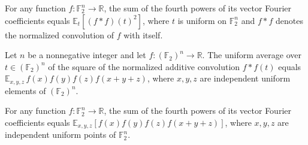 \begin{theorem}
\label{FABL.vectorFourierFourthMoment_eq_expect_convolution_mul_self}
\leanok
{}
For any function $f:\mathbb{F}_2^n\to\mathbb{R}$, the sum of the fourth powers of its
vector Fourier coefficients equals $\mathbb{E}_t[(f*f)(t)^2]$, where $t$ is uniform on
$\mathbb{F}_2^n$ and $f*f$ denotes the normalized convolution of $f$ with itself.
\end{theorem}

\begin{theorem}
\label{FABL.expect_convolution_mul_self_eq_additiveEnergy}
\leanok
{}
Let $n$ be a nonnegative integer and let $f:(\mathbb F_2)^n\to\mathbb R$. The uniform
average over $t\in(\mathbb F_2)^n$ of the square of the normalized additive
convolution $f*f(t)$ equals $\mathbb E_{x,y,z}\, f(x)f(y)f(z)f(x+y+z)$, where $x,y,z$
are independent uniform elements of $(\mathbb F_2)^n$.
\end{theorem}

\begin{theorem}
\label{FABL.vectorFourierFourthMoment_eq_additiveEnergy}
\leanok
{}
For any function $f:\mathbb{F}_2^n\to\mathbb{R}$, the sum of the fourth powers of its
vector Fourier coefficients equals $\mathbb{E}_{x,y,z}[f(x)f(y)f(z)f(x+y+z)]$, where
$x,y,z$ are independent uniform points of $\mathbb{F}_2^n$.
\end{theorem}
